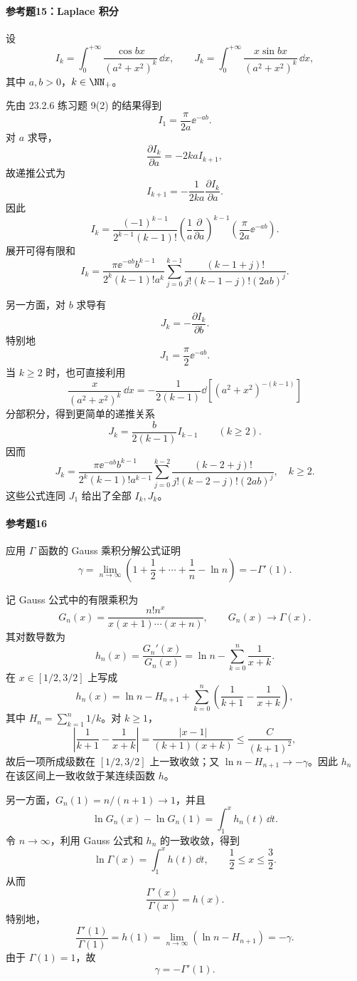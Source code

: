 \paragraph{参考题15：Laplace 积分}
设
\[
I_k=\int_0^{+\infty}\frac{\cos bx}{(a^2+x^2)^k}\,\dd x,
\qquad
J_k=\int_0^{+\infty}\frac{x\sin bx}{(a^2+x^2)^k}\,\dd x,
\]
其中 $a,b>0$，$k\in\NN_+$。

\begin{xsolution}
先由 23.2.6 练习题 9(2) 的结果得到
\[
I_1=\frac\pi{2a}\ee^{-ab}.
\]
对 $a$ 求导，
\[
\frac{\partial I_k}{\partial a}
=-2kaI_{k+1},
\]
故递推公式为
\[
\boxed{I_{k+1}=-\frac1{2ka}\frac{\partial I_k}{\partial a}}.
\]
因此
\[
\boxed{
I_k=\frac{(-1)^{k-1}}{2^{k-1}(k-1)!}
\left(\frac1a\frac{\partial}{\partial a}\right)^{k-1}
\left(\frac\pi{2a}\ee^{-ab}\right).}
\]
展开可得有限和
\[
\boxed{
I_k=
\frac{\pi\ee^{-ab}b^{k-1}}{2^k(k-1)!a^k}
\sum_{j=0}^{k-1}
\frac{(k-1+j)!}{j!(k-1-j)!(2ab)^j}.}
\]

另一方面，对 $b$ 求导有
\[
\boxed{J_k=-\frac{\partial I_k}{\partial b}}.
\]
特别地
\[
\boxed{J_1=\frac\pi2\ee^{-ab}}.
\]
当 $k\geqslant2$ 时，也可直接利用
\[
\frac{x}{(a^2+x^2)^k}\,\dd x
=-\frac1{2(k-1)}\dd\left[(a^2+x^2)^{-(k-1)}\right]
\]
分部积分，得到更简单的递推关系
\[
\boxed{J_k=\frac b{2(k-1)}I_{k-1}\qquad(k\geqslant2)}.
\]
因而
\[
\boxed{
J_k=
\frac{\pi\ee^{-ab}b^{k-1}}{2^k(k-1)!a^{k-1}}
\sum_{j=0}^{k-2}
\frac{(k-2+j)!}{j!(k-2-j)!(2ab)^j},
\quad k\geqslant2.}
\]
这些公式连同 $J_1$ 给出了全部 $I_k,J_k$。
\end{xsolution}

\paragraph{参考题16}
应用 $\Gamma$ 函数的 Gauss 乘积分解公式证明
\[
\gamma=\lim_{n\to\infty}\left(1+\frac12+\cdots+\frac1n-\ln n\right)
=-\Gamma'(1).
\]

\begin{xsolution}
记 Gauss 公式中的有限乘积为
\[
G_n(x)=\frac{n!n^x}{x(x+1)\cdots(x+n)},
\qquad G_n(x)\to\Gamma(x).
\]
其对数导数为
\[
h_n(x)=\frac{G_n'(x)}{G_n(x)}
=\ln n-\sum_{k=0}^n\frac1{x+k}.
\]
在 $x\in[1/2,3/2]$ 上写成
\[
h_n(x)=\ln n-H_{n+1}
+\sum_{k=0}^n\left(\frac1{k+1}-\frac1{x+k}\right),
\]
其中 $H_n=\sum_{k=1}^n1/k$。对 $k\geqslant1$，
\[
\left|\frac1{k+1}-\frac1{x+k}\right|
=\frac{|x-1|}{(k+1)(x+k)}
\leqslant\frac{C}{(k+1)^2},
\]
故后一项所成级数在 $[1/2,3/2]$ 上一致收敛；又
$\ln n-H_{n+1}\to-\gamma$。因此 $h_n$ 在该区间上一致收敛于某连续函数 $h$。

另一方面，$G_n(1)=n/(n+1)\to1$，并且
\[
\ln G_n(x)-\ln G_n(1)=\int_1^x h_n(t)\,\dd t.
\]
令 $n\to\infty$，利用 Gauss 公式和 $h_n$ 的一致收敛，得到
\[
\ln\Gamma(x)=\int_1^x h(t)\,\dd t,
\qquad \frac12\leqslant x\leqslant\frac32.
\]
从而
\[
\frac{\Gamma'(x)}{\Gamma(x)}=h(x).
\]
特别地，
\[
\frac{\Gamma'(1)}{\Gamma(1)}
=h(1)=\lim_{n\to\infty}(\ln n-H_{n+1})=-\gamma.
\]
由于 $\Gamma(1)=1$，故
\[
\boxed{\gamma=-\Gamma'(1)}.
\]
\end{xsolution}

